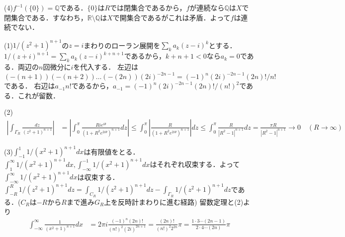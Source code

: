 \documentclass[
		book,
		head_space=20mm,
		foot_space=20mm,
		gutter=10mm,
		line_length=190mm
]{jlreq}
\begin{document}
(4)$f^{-1}(\{0\})=\mathbb{Q}$である．$\{0\}$は$R$では閉集合であるから，$f$が連続なら$\mathbb{Q}$は$X$で閉集合である．すなわち，$\mathbb{R}\setminus \mathbb{Q}$は$X$で開集合であるがこれは矛盾．よって$f$は連続でない．

(1)$1/{(z^2+1)^{n+1}}$の$z=i$まわりのローラン展開を$\sum_k a_k(z-i)^k$とする．
$1/(z+i)^{n+1}=\sum_k a_k (z-i)^{k+n+1}$であるから，$k+n+1<0$なら$a_k=0$である．両辺の$n$回微分に$i$を代入する．
左辺は$(-(n+1))(-(n+2))\dots(-(2n))(2i)^{-2n-1}=(-1)^n(2i)^{-2n-1}(2n)!/n!$である．
右辺は$a_{-1}n!$であるから，$a_{-1}=(-1)^n(2i)^{-2n-1}(2n)!/(n!)^2$である．これが留数．

(2)\begin{align}
    \left| \int_{\Gamma_R }\frac{dz}{(z^2+1)^{n+1}} \right|&= \left| \int_0^\pi \frac{Ri e^{i \theta}}{(1+R^2e^{2i\theta})^{n+1}}dz \right|\le \int_0^\pi \left| \frac{R}{(1+R^2e^{2i\theta})^{n+1}} \right| dz\le \int_0^\pi \frac{R}{|R^2-1|^{n+1}}dz=\frac{\pi R}{|R^2-1|^{n+1}}\rightarrow 0\quad (R\rightarrow \infty)
\end{align}

(3)$\int_{-1}^1 1/(x^2+1)^{n+1}dx$は有限値をとる．$\int_1^\infty 1/(x^2+1)^{n+1}dx,\int_{-\infty}^{-1} 1/(x^2+1)^{n+1}dx$はそれぞれ収束する．よって$\int_{-\infty}^\infty 1/(x^2+1)^{n+1}dx$は収束する．
$\int_{-R}^R 1/(z^2+1)^{n+1}dz=\int_{C_R} 1/(z^2+1)^{n+1}dz-\int_{\Gamma_R} 1/(z^2+1)^{n+1}dz$である．($C_R$は$-R$から$R$まで進み$G_R$上を反時計まわりに進む経路)
留数定理と(2)より
\begin{align}
    \int_{-\infty}^\infty \frac{1}{(x^2+1)^{n+1}}dx&=2\pi i\frac{(-1)^n(2n)!}{(n!)^2(2i)^{2n+1}}=\frac{(2n)!}{(n!)^2 2^{2n}}\pi=\frac{1\cdot3 \cdots (2n-1)}{2\cdot4\cdots (2n)}\pi
\end{align}
\end{document}
